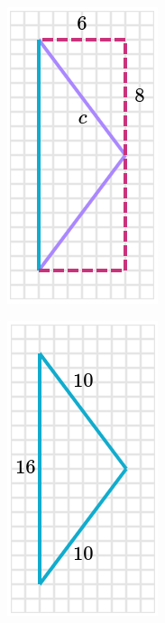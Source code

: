 \begin{solutionbox}{14cm}
\begin{minipage}{0.4\textwidth}
\begin{multicols}{2}
\begin{figure}[H]
                \caption{}
                \label{fig:peri_isos_03b}
            \end{figure}
        \end{multicols}
        \begin{multicols}{2}
            \begin{figure}[H]
                \centering
                \includegraphics[width=0.5\linewidth]{../images/peri_isos_03c.png}
                \caption{}
                \label{fig:peri_isos_03c}
            \end{figure}%
            \begin{figure}[H]
                \centering
                \includegraphics[width=0.5\linewidth]{../images/peri_isos_03d.png}

\end{figure}
\end{multicols}
\end{minipage}
\end{solutionbox}
